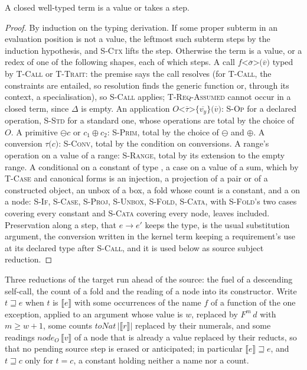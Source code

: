 \begin{lemma}[Progress]
\label{lem:progress}
A closed well-typed term is a value or takes a step.
\end{lemma}

\begin{proof}
By induction on the typing derivation.
If some proper subterm in an evaluation position is not a value, the leftmost such subterm steps by the induction hypothesis, and \textsc{S-Ctx} lifts the step.
Otherwise the term is a value, or a redex of one of the following shapes, each of which steps.
A call $f\texttt{<}\overline{\sigma}\texttt{>(}\overline{v}\texttt{)}$ typed by \textsc{T-Call} or \textsc{T-Trait}: the premise says the call resolves (for \textsc{T-Call}, the constraints are entailed, so resolution finds the generic function or, through its context, a specialisation), so \textsc{S-Call} applies; \textsc{T-Req-Assumed} cannot occur in a closed term, since $\Delta$ is empty.
An application $O\texttt{<}\overline{\tau}\texttt{>\{}\overline{v_y}\texttt{\}(}\overline{v}\texttt{)}$: \textsc{S-Op} for a declared operation, \textsc{S-Std} for a standard one, whose operations are total by the choice of $O$.
A primitive $\ominus c$ or $c_1 \oplus c_2$: \textsc{S-Prim}, total by the choice of $\ominus$ and $\oplus$.
A conversion $\tau\texttt{(}c\texttt{)}$: \textsc{S-Conv}, total by the condition on conversions.
A range's operation on a value of a range: \textsc{S-Range}, total by its extension to the empty range.
A conditional on a constant of type , a case on a value of a sum, which by \textsc{T-Case} and canonical forms is an injection, a projection of a pair or of a constructed object, an unbox of a box, a fold whose count is a constant, and a  on a node: \textsc{S-If}, \textsc{S-Case}, \textsc{S-Proj}, \textsc{S-Unbox}, \textsc{S-Fold}, \textsc{S-Cata}, with \textsc{S-Fold}'s two cases covering every constant and \textsc{S-Cata} covering every node, leaves included.
Preservation along a step, that $e \longrightarrow e'$ keeps the type, is the usual substitution argument, the conversion written in the kernel term keeping a requirement's use at its declared type after \textsc{S-Call}, and it is used below as source subject reduction.
\end{proof}

Three reductions of the target run ahead of the source: the fuel of a descending self-call, the count of a fold and the reading of a node into its constructor.
Write $t \sqsupseteq e$ when $t$ is $\llbracket e \rrbracket$ with some occurrences of the name $f$ of a function of the one exception, applied to an argument whose value is $w$, replaced by $F^{m}\,d$ with $m \geq w + 1$, some counts $\mathit{toNat}\,|\llbracket r \rrbracket|$ replaced by their numerals, and some readings $\mathit{node}_{O}\,\llbracket v \rrbracket$ of a node that is already a value replaced by their reducts, so that no pending source step is erased or anticipated; in particular $\llbracket e \rrbracket \sqsupseteq e$, and $t \sqsupseteq c$ only for $t = c$, a constant holding neither a name nor a count.

